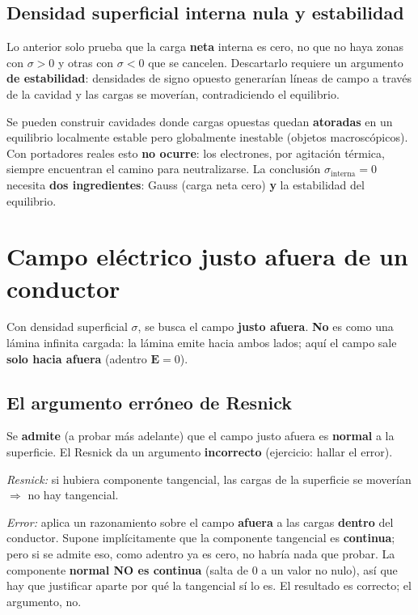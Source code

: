 \documentclass[12pt,a4paper]{article}
\begin{document}


\subsection{Densidad superficial interna nula y estabilidad}

Lo anterior solo prueba que la carga \textbf{neta} interna es cero, no
que no haya zonas con $\sigma>0$ y otras con $\sigma<0$ que se cancelen.
Descartarlo requiere un argumento \textbf{de estabilidad}: densidades de
signo opuesto generarían líneas de campo a través de la cavidad y las
cargas se moverían, contradiciendo el equilibrio.



\begin{notebox}
  Se pueden construir cavidades donde cargas opuestas quedan
  \textbf{atoradas} en un equilibrio localmente estable pero globalmente
  inestable (objetos macroscópicos). Con portadores reales esto
  \textbf{no ocurre}: los electrones, por agitación térmica, siempre
  encuentran el camino para neutralizarse. La conclusión
  $\sigma_{\text{interna}}=0$ necesita \textbf{dos ingredientes}: Gauss
  (carga neta cero) \textbf{y} la estabilidad del equilibrio.
\end{notebox}

\section{Campo eléctrico justo afuera de un conductor}

Con densidad superficial $\sigma$, se busca el campo \textbf{justo
afuera}. \textbf{No} es como una lámina infinita cargada: la lámina
emite hacia ambos lados; aquí el campo sale \textbf{solo hacia afuera}
(adentro $\mathbf{E}=0$).

\subsection{El argumento erróneo de Resnick}

Se \textbf{admite} (a probar más adelante) que el campo justo afuera es
\textbf{normal} a la superficie. El Resnick da un argumento
\textbf{incorrecto} (ejercicio: hallar el error).

\begin{warnbox}
  \emph{Resnick:} si hubiera componente tangencial, las cargas de la
  superficie se moverían $\Rightarrow$ no hay tangencial.

  \emph{Error:} aplica un razonamiento sobre el campo \textbf{afuera} a
  las cargas \textbf{dentro} del conductor. Supone implícitamente que la
  componente tangencial es \textbf{continua}; pero si se admite eso,
  como adentro ya es cero, no habría nada que probar. La componente
  \textbf{normal NO es continua} (salta de $0$ a un valor no nulo), así
  que hay que justificar aparte por qué la tangencial sí lo es. El
  resultado es correcto; el argumento, no.
\end{warnbox}
\end{document}
